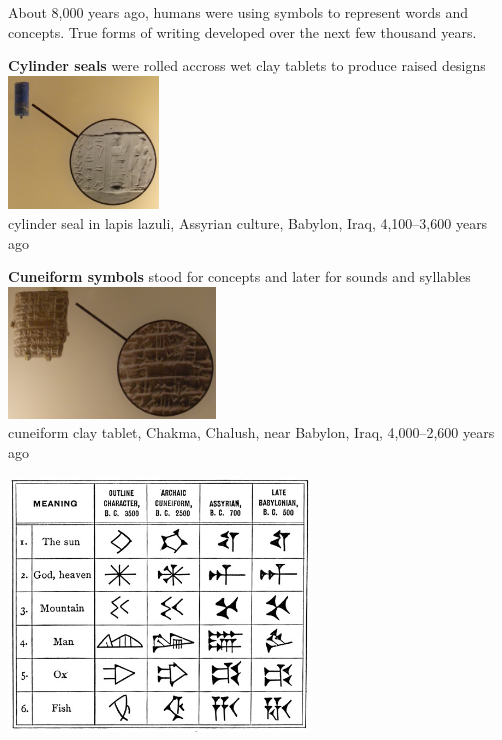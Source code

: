 \begin{frame}

About 8,000 years ago, humans were using symbols to represent words
and concepts.
True forms of writing developed over the next few thousand years. 

\begin{minipage}{5cm}
\raggedright
{\bf Cylinder seals} were rolled accross wet clay tablets to
produce raised designs \\[3mm]
\includegraphics[width=4cm]{figures/cylinder.jpg} \\
cylinder seal in lapis lazuli,
Assyrian culture,
Babylon, Iraq,
4,100--3,600 years ago
\end{minipage}
\begin{minipage}{5.5cm}
\raggedright
{\bf Cuneiform symbols} stood for concepts and later for sounds and
syllables \\[3mm]
\includegraphics[width=5.5cm]{figures/cuneiform.jpg} \\
cuneiform clay tablet,
Chakma, Chalush, near Babylon, Iraq,
4,000--2,600 years ago
\end{minipage}
\end{frame}

\begin{frame}

\begin{center}
\includegraphics[width=8cm]{figures/cuneiform-symbols.jpg}
\end{center}
\end{frame}

